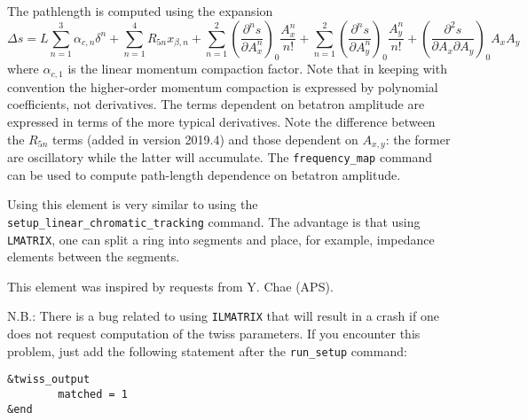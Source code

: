 The pathlength is computed using the expansion
\begin{equation}
\Delta s = L\sum_{n=1}^3 \alpha_{c,n} \delta^n + 
\sum_{n=1}^4 R_{5n} x_{\beta,n} +
\sum_{n=1}^2 \left(\frac{\partial^n s}{\partial A_x^n}\right)_0 \frac{A_x^n}{n!} +
\sum_{n=1}^2 \left(\frac{\partial^n s}{\partial A_y^n}\right)_0 \frac{A_y^n}{n!} +
\left(\frac{\partial^2 s}{\partial A_x\partial A_y}\right)_0 A_x A_y
\end{equation}
where $\alpha_{c,1}$ is the linear momentum compaction factor.
Note that in keeping with convention the higher-order momentum compaction is expressed
by polynomial coefficients, not derivatives.
The terms dependent on betatron amplitude are expressed in terms of the more typical
derivatives.
Note the difference between the $R_{5n}$ terms (added in version 2019.4) and those dependent on $A_{x,y}$: the
former are oscillatory while the latter will accumulate. 
The \verb|frequency_map| command can be used to compute path-length dependence on betatron
amplitude.

Using this element is very similar to using the \verb|setup_linear_chromatic_tracking| command.
The advantage is that using {\tt LMATRIX}, one can split a ring into segments
and place, for example, impedance elements between the segments.

This element was inspired by requests from Y. Chae (APS).

N.B.: There is a bug related to using {\tt ILMATRIX} that will result in a crash
if one does not request computation of the twiss parameters. If you encounter this
problem, just add the following statement after the \verb|run_setup| command:
\begin{verbatim}
&twiss_output
        matched = 1
&end
\end{verbatim}


